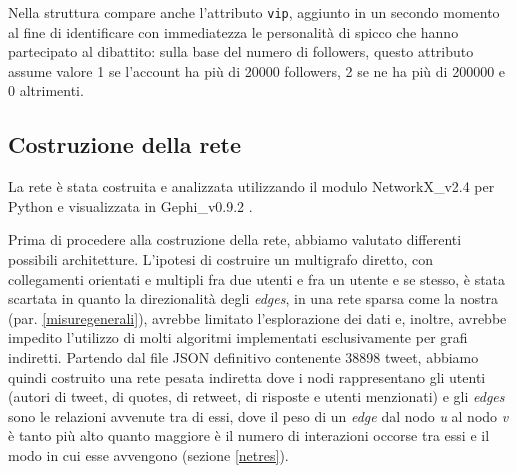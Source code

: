     Nella struttura compare anche l'attributo \texttt{vip}, aggiunto in un secondo momento al fine di identificare con immediatezza le personalità di spicco che hanno partecipato al dibattito: sulla base del numero di followers, questo attributo assume valore 1 se l'account ha più di 20000 followers, 2 se ne ha più di 200000 e 0 altrimenti.
    
    \subsection{Costruzione della rete}\label{costruzionerete}   
    
    La rete è stata costruita e analizzata utilizzando il modulo NetworkX\_v2.4 per Python \cite{osti_960616} e  visualizzata in Gephi\_v0.9.2 \cite{Bastian_Heymann_Jacomy_2009}.
    
    Prima di procedere alla costruzione della rete, abbiamo valutato differenti possibili architetture. L'ipotesi di costruire un multigrafo diretto, con collegamenti orientati e multipli fra due utenti e fra un utente e se stesso, è stata scartata in quanto la direzionalità degli \textit{edges}, in una rete sparsa come la nostra (par. \ref{misuregenerali}), avrebbe limitato l'esplorazione dei dati e, inoltre, avrebbe impedito l'utilizzo di molti algoritmi implementati esclusivamente per grafi indiretti. Partendo dal file JSON definitivo contenente 38898 tweet, abbiamo quindi costruito una rete pesata indiretta dove i nodi rappresentano gli utenti (autori di tweet, di quotes, di retweet, di risposte e utenti menzionati) e gli \textit{edges} sono le relazioni avvenute tra di essi, dove il peso di un \textit{edge} dal nodo \textit{u} al nodo \textit{v} è tanto più alto quanto maggiore è il numero di interazioni occorse tra essi e il modo in cui esse avvengono (sezione \ref{netres}).


    